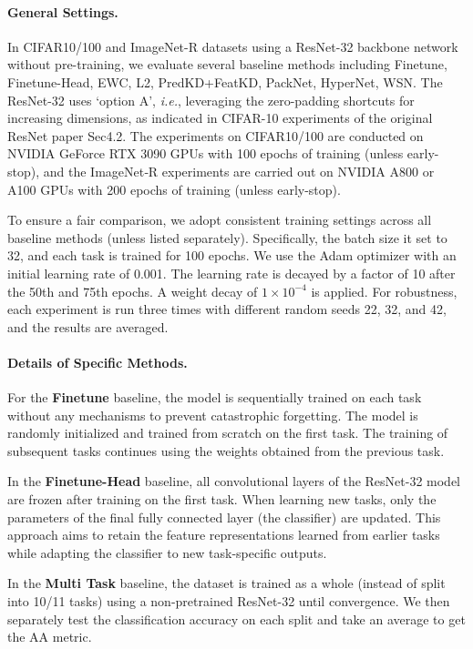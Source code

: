 \paragraph{General Settings.} In CIFAR10/100 and ImageNet-R datasets using a ResNet-32 backbone network without pre-training, we evaluate several baseline methods including Finetune, Finetune-Head, EWC, L2, PredKD+FeatKD, PackNet, HyperNet, WSN. 
The ResNet-32 uses `option A', \textit{i.e.}, leveraging the zero-padding shortcuts for increasing dimensions, as indicated in CIFAR-10 experiments of the original ResNet paper Sec4.2. 
The experiments on CIFAR10/100 are conducted on NVIDIA GeForce RTX 3090 GPUs with 100 epochs of training (unless early-stop), and the ImageNet‑R experiments are carried out on NVIDIA A800 or A100 GPUs with 200 epochs of training (unless early-stop).

To ensure a fair comparison, we adopt consistent training settings across all baseline methods (unless listed separately). Specifically, the batch size it set to 32, and each task is trained for 100 epochs. We use the Adam optimizer with an initial learning rate of 0.001. The learning rate is decayed by a factor of 10 after the 50th and 75th epochs. A weight decay of $1 \times 10^{-4}$ is applied. For robustness, each experiment is run three times with different random seeds 22, 32, and 42, and the results are averaged.

\paragraph{Details of Specific Methods.} 

For the \textbf{Finetune} baseline, the model is sequentially trained on each task without any mechanisms to prevent catastrophic forgetting. The model is randomly initialized and trained from scratch on the first task. The training of subsequent tasks continues using the weights obtained from the previous task.

In the \textbf{Finetune-Head} baseline, all convolutional layers of the ResNet-32 model are frozen after training on the first task. When learning new tasks, only the parameters of the final fully connected layer (the classifier) are updated. This approach aims to retain the feature representations learned from earlier tasks while adapting the classifier to new task-specific outputs.

In the \textbf{Multi Task} baseline, the dataset is trained as a whole (instead of split into 10/11 tasks) using a non-pretrained ResNet-32 until convergence. We then separately test the classification accuracy on each split and take an average to get the AA metric.

